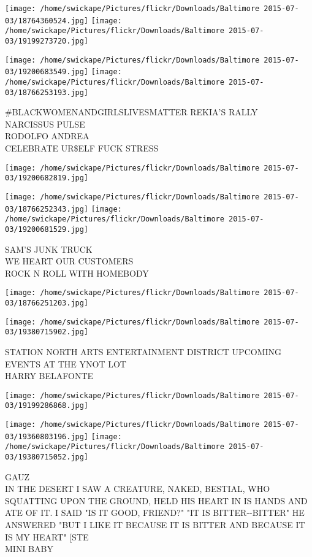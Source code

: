 \documentclass[10pt,letterpaper]{article}
\begin{document}
\texttt{[image: /home/swickape/Pictures/flickr/Downloads/Baltimore 2015-07-03/18764360524.jpg]}
\texttt{[image: /home/swickape/Pictures/flickr/Downloads/Baltimore 2015-07-03/19199273720.jpg]}

\texttt{[image: /home/swickape/Pictures/flickr/Downloads/Baltimore 2015-07-03/19200683549.jpg]}
\texttt{[image: /home/swickape/Pictures/flickr/Downloads/Baltimore 2015-07-03/18766253193.jpg]}

\#BLACKWOMENANDGIRLSLIVESMATTER REKIA'S RALLY\\
NARCISSUS PULSE\\
RODOLFO ANDREA\\
CELEBRATE UR\$ELF FUCK STRESS
\pagebreak

\texttt{[image: /home/swickape/Pictures/flickr/Downloads/Baltimore 2015-07-03/19200682819.jpg]}

\vspace{0.25in}
\texttt{[image: /home/swickape/Pictures/flickr/Downloads/Baltimore 2015-07-03/18766252343.jpg]}
\texttt{[image: /home/swickape/Pictures/flickr/Downloads/Baltimore 2015-07-03/19200681529.jpg]}

SAM'S JUNK TRUCK\\
WE HEART OUR CUSTOMERS\\
ROCK N ROLL WITH HOMEBODY
\pagebreak

\texttt{[image: /home/swickape/Pictures/flickr/Downloads/Baltimore 2015-07-03/18766251203.jpg]}

\vspace{0.25in}
\texttt{[image: /home/swickape/Pictures/flickr/Downloads/Baltimore 2015-07-03/19380715902.jpg]}

STATION NORTH ARTS ENTERTAINMENT DISTRICT UPCOMING EVENTS AT THE YNOT LOT\\
HARRY BELAFONTE
\pagebreak

\texttt{[image: /home/swickape/Pictures/flickr/Downloads/Baltimore 2015-07-03/19199286868.jpg]}

\vspace{0.25in}
\texttt{[image: /home/swickape/Pictures/flickr/Downloads/Baltimore 2015-07-03/19360803196.jpg]}
\texttt{[image: /home/swickape/Pictures/flickr/Downloads/Baltimore 2015-07-03/19380715052.jpg]}

GAUZ\\
IN THE DESERT I SAW A CREATURE, NAKED, BESTIAL, WHO SQUATTING UPON THE GROUND, HELD HIS HEART IN IS HANDS AND ATE OF IT.  I SAID "IS IT GOOD, FRIEND?"  "IT IS BITTER{-}{-}BITTER" HE ANSWERED "BUT I LIKE IT BECAUSE IT IS BITTER AND BECAUSE IT IS MY HEART" {[}STE\\
MINI BABY
\pagebreak
\end{document}
